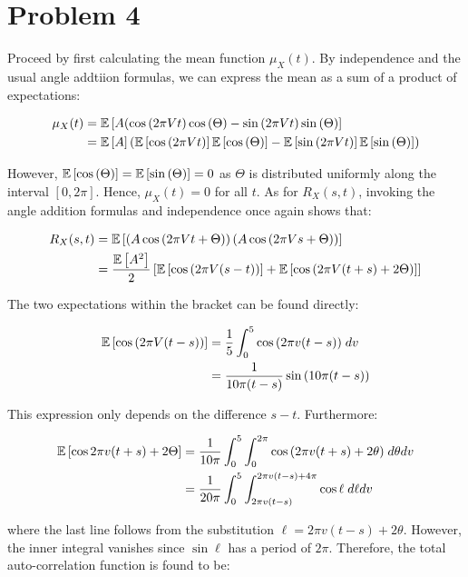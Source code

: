 \documentclass[12pt]{article}%
\begin{document}
\section{Problem 4}
Proceed by first calculating the mean function $\mu_X(t)$. By independence and the usual angle addtiion formulas, we can express the mean as a sum of a product of expectations:

\begin{align*}
\mu_X(t) & = \mathbb{E}\left[A(\cos{(2\pi V t)}\cos{(\Theta)} - \sin{(2\pi V t)}\sin{(\Theta)}\right] \\
& = \mathbb{E}\left[A\right]\left(\mathbb{E}\left[\cos{(2\pi V t)}\right]\mathbb{E}\left[\cos{(\Theta)}\right] - \mathbb{E}\left[\sin{(2\pi V t)}\right]\mathbb{E}\left[\sin{(\Theta)}\right]\right) \\
\end{align*}

However, $\mathbb{E}\left[\cos{(\Theta)}\right] = \mathbb{E}\left[\sin{(\Theta)}\right] = 0$ as $\Theta$ is distributed uniformly along the interval $[0,2\pi]$. Hence, $\mu_X(t) = 0$ for all $t$. As for $R_X(s,t)$, invoking the angle addition formulas and independence once again shows that:

\begin{align*}
  R_X(s,t) & = \mathbb{E}\left[\left(A\cos{(2\pi V t + \Theta)}\right)\left(A\cos{(2\pi V s + \Theta)}\right)\right] \\
  & = \frac{\mathbb{E}\left[A^2\right]}{2} \left[\mathbb{E}\left[\cos{(2 \pi V (s-t))}\right] + \mathbb{E}\left[\cos{(2\pi V(t+s) + 2\Theta)}\right]\right]
\end{align*}

The two expectations within the bracket can be found directly:

\begin{align*}
\mathbb{E}\left[\cos{(2\pi V(t-s))}\right] & = \frac{1}{5}\int_0^5 \cos{(2\pi v (t-s))} \; dv \\
& = \frac{1}{10\pi(t-s)}\sin{(10\pi(t-s))}
\end{align*}

This expression only depends on the difference $s-t$. Furthermore:

\begin{align*}
  \mathbb{E}\left[\cos{2\pi v (t+s) + 2\Theta}\right] & = \frac{1}{10\pi}\int_0^5\int_0^{2\pi} \cos{(2\pi v (t+s) + 2\theta)} \; d\theta dv \\
  & = \frac{1}{20\pi}\int_0^5\int_{2\pi v (t-s)}^{2\pi v (t-s) + 4\pi} \cos{\ell} \; d\ell dv
\end{align*}

where the last line follows from the substitution $\ell = 2\pi v (t-s) + 2\theta$. However, the inner integral vanishes since $\sin{\ell}$ has a period of $2\pi$. Therefore, the total auto-correlation function is found to be:
\end{document}
